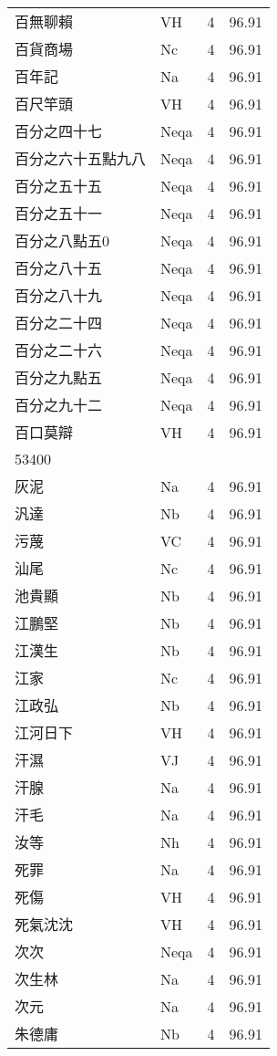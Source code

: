 \documentclass[twocolumn]{book}
\begin{document}
\begin{supertabular}{llrr}
百無聊賴 & VH & 4 &  96.91\\
百貨商場 & Nc & 4 &  96.91\\
百年記 & Na & 4 &  96.91\\
百尺竿頭 & VH & 4 &  96.91\\
百分之四十七 & Neqa & 4 &  96.91\\
百分之六十五點九八 & Neqa & 4 &  96.91\\
百分之五十五 & Neqa & 4 &  96.91\\
百分之五十一 & Neqa & 4 &  96.91\\
百分之八點五0 & Neqa & 4 &  96.91\\
百分之八十五 & Neqa & 4 &  96.91\\
百分之八十九 & Neqa & 4 &  96.91\\
百分之二十四 & Neqa & 4 &  96.91\\
百分之二十六 & Neqa & 4 &  96.91\\
百分之九點五 & Neqa & 4 &  96.91\\
百分之九十二 & Neqa & 4 &  96.91\\
百口莫辯 & VH & 4 &  96.91\\
53400\\
灰泥 & Na & 4 &  96.91\\
汎達 & Nb & 4 &  96.91\\
污蔑 & VC & 4 &  96.91\\
汕尾 & Nc & 4 &  96.91\\
池貴顯 & Nb & 4 &  96.91\\
江鵬堅 & Nb & 4 &  96.91\\
江漢生 & Nb & 4 &  96.91\\
江家 & Nc & 4 &  96.91\\
江政弘 & Nb & 4 &  96.91\\
江河日下 & VH & 4 &  96.91\\
汗濕 & VJ & 4 &  96.91\\
汗腺 & Na & 4 &  96.91\\
汗毛 & Na & 4 &  96.91\\
汝等 & Nh & 4 &  96.91\\
死罪 & Na & 4 &  96.91\\
死傷 & VH & 4 &  96.91\\
死氣沈沈 & VH & 4 &  96.91\\
次次 & Neqa & 4 &  96.91\\
次生林 & Na & 4 &  96.91\\
次元 & Na & 4 &  96.91\\
朱德庸 & Nb & 4 &  96.91\\

\end{supertabular}
\end{document}

